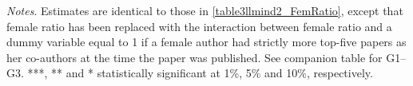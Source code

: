 \begin{table}
\begin{threeparttable}
\begin{tablenotes}
            \tiny
            \item \textit{Notes}. Estimates are identical to those in \autoref{table3llmind2_FemRatio}, except that female ratio has been replaced with the interaction between female ratio and a dummy variable equal to 1 if a female author had strictly more top-five papers as her co-authors at the time the paper was published. See companion table for G1--G3. ***, ** and * statistically significant at 1\%, 5\% and 10\%, respectively.
        \end{tablenotes}
    \end{threeparttable}

\end{table}
